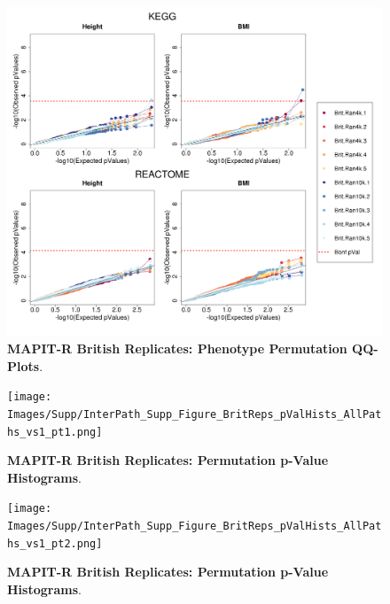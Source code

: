 \documentclass[12pt, a4paper]{article}
\begin{document}
\begin{figure}[htbp]
\centering
\includegraphics[scale=.35]{Images/Supp/InterPath_Supp_Figure_BritReps_perm1_QQPlots_AllPaths_vs1.png}
\caption[TBD]{\textbf{MAPIT-R British Replicates: Phenotype Permutation QQ-Plots}.}
\label{InterPath-Supp-Figure-BritReps-perm1-QQPlots-AllPaths}
\end{figure}
\clearpage

\begin{figure}[htbp]
\centering
\vspace*{-1cm}
\texttt{[image: Images/Supp/InterPath\_Supp\_Figure\_BritReps\_pValHists\_AllPaths\_vs1\_pt1.png]}
\caption[TBD]{\textbf{MAPIT-R British Replicates: Permutation p-Value Histograms}.}
\label{InterPath-Supp-Figure-BritReps-10perms-pValHists-pt1}
\end{figure}
\clearpage
\addtocounter{figure}{-1}

\begin{figure}[htbp]
\centering
\vspace*{-1cm}
\texttt{[image: Images/Supp/InterPath\_Supp\_Figure\_BritReps\_pValHists\_AllPaths\_vs1\_pt2.png]}
\caption[TBD]{\textbf{MAPIT-R British Replicates: Permutation p-Value Histograms}.}
\label{InterPath-Supp-Figure-BritReps-10perms-pValHists-pt2}
\end{figure}
\clearpage
\end{document}
